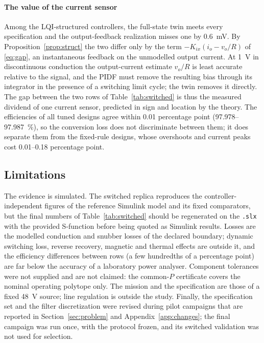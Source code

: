\paragraph{The value of the current sensor}
Among the LQI-structured controllers, the full-state twin meets every
specification and the output-feedback realization misses one by
\SI{0.6}{mV}. By Proposition~\ref{prop:struct} the two differ only by the term
$-K_{ix}(i_o-v_o/R)$ of \eqref{eq:gap}, an instantaneous feedback on the
unmodelled output current. At \SI{1}{V} in discontinuous conduction the
output-current estimate $v_o/R$ is least accurate relative to the signal, and
the PIDF must remove the resulting bias through its integrator in the presence
of a switching limit cycle; the twin removes it directly. The gap between the
two rows of Table~\ref{tab:switched} is thus the measured dividend of one
current sensor, predicted in sign and location by the theory. The efficiencies
of all tuned designs agree within 0.01 percentage point
(97.978--\SI{97.987}{\percent}), so the conversion loss does not discriminate
between them; it does separate them from the fixed-rule designs, whose
overshoots and current peaks cost 0.01--0.18 percentage point.

\subsection{Limitations}
The evidence is simulated. The switched replica reproduces the controller-independent
figures of the reference Simulink model and its fixed comparators, but the
final numbers of Table~\ref{tab:switched} should be regenerated on the
\texttt{.slx} with the provided S-function before being quoted as Simulink
results. Losses are the modelled conduction and snubber losses of the declared
boundary; dynamic switching loss, reverse recovery, magnetic and thermal effects
are outside it, and the efficiency differences between rows (a few hundredths
of a percentage point) are far below the accuracy of a laboratory power
analyser. Component tolerances were not supplied and are not claimed: the
common-$P$ certificate covers the nominal operating polytope only. The mission
and the specification are those of a fixed \SI{48}{V} source; line regulation
is outside the study. Finally, the specification set and the filter discretization were revised
during pilot campaigns that are reported in Section~\ref{sec:problem} and
Appendix~\ref{app:changes}; the final
campaign was run once, with the protocol frozen, and its switched validation
was not used for selection.

